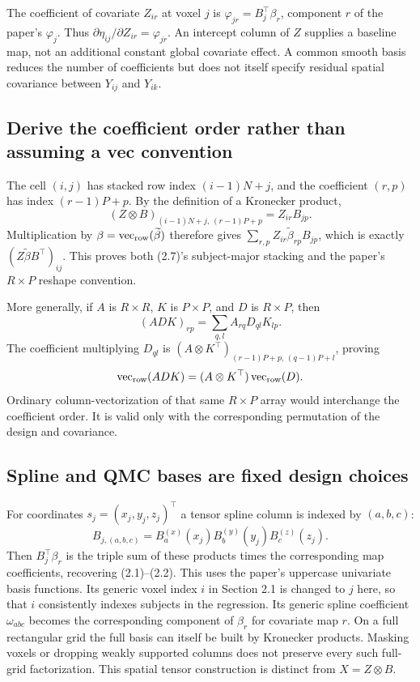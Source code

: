 \documentclass[11pt,a4paper]{article}
\newcommand{\vr}{\operatorname{vec}_{\rm row}}
\numberwithin{equation}{section}
\begin{document}
The coefficient of covariate $Z_{ir}$ at voxel $j$ is
$\varphi_{jr}=B_j^\top\beta_r$, component $r$ of the paper's
$\varphi_j$. Thus $\partial\eta_{ij}/\partial Z_{ir}=\varphi_{jr}$.
An intercept column of $Z$ supplies a baseline map, not an additional
constant global covariate effect. A common smooth basis reduces the
number of coefficients but does not itself specify residual spatial
covariance between $Y_{ij}$ and $Y_{ik}$.

\subsection{Derive the coefficient order rather than assuming a vec convention}
The cell $(i,j)$ has stacked row index $(i-1)N+j$, and the
coefficient $(r,p)$ has index $(r-1)P+p$.
By the definition of a Kronecker product,
\[
 (Z\otimes B)_{(i-1)N+j,\,(r-1)P+p}=Z_{ir}B_{jp}.
\]
Multiplication by $\beta=\vr(\widetilde\beta)$ therefore gives
$\sum_{r,p}Z_{ir}\widetilde\beta_{rp}B_{jp}$, which is exactly
$(Z\widetilde\beta B^\top)_{ij}$.
This proves both (2.7)'s subject-major stacking and the paper's
$R\times P$ reshape convention.

More generally, if $A$ is $R\times R$, $K$ is $P\times P$,
and $D$ is $R\times P$, then
\[
 (ADK)_{rp}=\sum_{q,l}A_{rq}D_{ql}K_{lp}.
\]
The coefficient multiplying $D_{ql}$ is
$(A\otimes K^\top)_{(r-1)P+p,\,(q-1)P+l}$, proving
\[
 \vr(ADK)=(A\otimes K^\top)\vr(D).
\]
Ordinary column-vectorization of that same $R\times P$ array
would interchange the coefficient order. It is valid only with
the corresponding permutation of the design and covariance.

\subsection{Spline and QMC bases are fixed design choices}
For coordinates $s_j=(x_j,y_j,z_j)^\top$ a tensor spline column
is indexed by $(a,b,c)$:
\[
 B_{j,(a,b,c)}
 =B_a^{(x)}(x_j)B_b^{(y)}(y_j)B_c^{(z)}(z_j).
\]
Then $B_j^\top\beta_r$ is the triple sum of these products times
the corresponding map coefficients, recovering (2.1)--(2.2).
This uses the paper's uppercase univariate basis functions.
Its generic voxel index $i$ in Section 2.1 is changed to $j$ here,
so that $i$ consistently indexes subjects in the regression.
Its generic spline coefficient $\omega_{abc}$ becomes the
corresponding component of $\beta_r$ for covariate map $r$.
On a full rectangular grid the full basis can itself be built by
Kronecker products. Masking voxels or dropping weakly supported
columns does not preserve every such full-grid factorization.
This spatial tensor construction is distinct from $X=Z\otimes B$.
\end{document}
